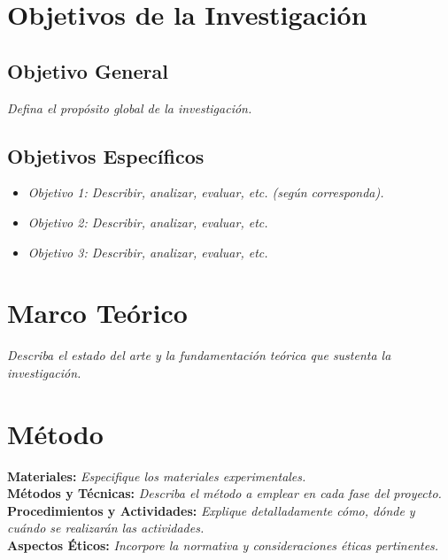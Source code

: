\documentclass[12pt,a4paper]{article}
\begin{document}
\section{Objetivos de la Investigación}
\subsection*{Objetivo General}
\noindent
\textit{Defina el propósito global de la investigación.}

\subsection*{Objetivos Específicos}
\begin{itemize}
    \item \textit{Objetivo 1: Describir, analizar, evaluar, etc. (según corresponda).}
    \item \textit{Objetivo 2: Describir, analizar, evaluar, etc.}
    \item \textit{Objetivo 3: Describir, analizar, evaluar, etc.}
\end{itemize}

\section{Marco Teórico}
\noindent
\textit{Describa el estado del arte y la fundamentación teórica que sustenta la investigación.}

\section{Método}
\noindent
\textbf{Materiales:} \textit{Especifique los materiales experimentales.} \\[1ex]
\textbf{Métodos y Técnicas:} \textit{Describa el método a emplear en cada fase del proyecto.} \\[1ex]
\textbf{Procedimientos y Actividades:} \textit{Explique detalladamente cómo, dónde y cuándo se realizarán las actividades.} \\[1ex]
\textbf{Aspectos Éticos:} \textit{Incorpore la normativa y consideraciones éticas pertinentes.}
\end{document}
